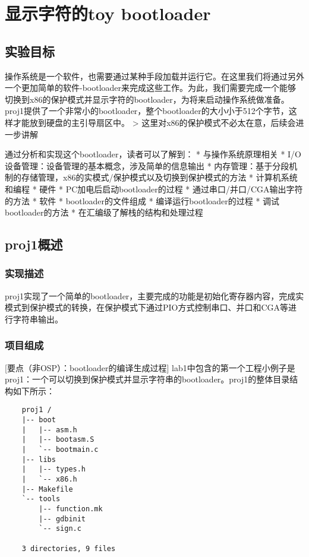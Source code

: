 \section{显示字符的toy
bootloader}\label{ux663eux793aux5b57ux7b26ux7684toy-bootloader}

\subsection{实验目标}\label{ux5b9eux9a8cux76eeux6807}

操作系统是一个软件，也需要通过某种手段加载并运行它。在这里我们将通过另外一个更加简单的软件-bootloader来完成这些工作。为此，我们需要完成一个能够切换到x86的保护模式并显示字符的bootloader，为将来启动操作系统做准备。proj1提供了一个非常小的bootloader，整个bootloader的大小小于512个字节，这样才能放到硬盘的主引导扇区中。
\textgreater{} 这里对x86的保护模式不必太在意，后续会进一步讲解

通过分析和实现这个bootloader，读者可以了解到： * 与操作系统原理相关 *
I/O设备管理：设备管理的基本概念，涉及简单的信息输出 *
内存管理：基于分段机制的存储管理，x86的实模式/保护模式以及切换到保护模式的方法
* 计算机系统和编程 * 硬件 * PC加电后启动bootloader的过程 *
通过串口/并口/CGA输出字符的方法 * 软件 * bootloader的文件组成 *
编译运行bootloader的过程 * 调试bootloader的方法 *
在汇编级了解栈的结构和处理过程

\subsection{proj1概述}\label{proj1ux6982ux8ff0}

\subsubsection{实现描述}\label{ux5b9eux73b0ux63cfux8ff0}

proj1实现了一个简单的bootloader，主要完成的功能是初始化寄存器内容，完成实模式到保护模式的转换，在保护模式下通过PIO方式控制串口、并口和CGA等进行字符串输出。

\subsubsection{项目组成}\label{ux9879ux76eeux7ec4ux6210}

{[}要点（非OSP）：bootloader的编译生成过程{]}
lab1中包含的第一个工程小例子是proj1：一个可以切换到保护模式并显示字符串的bootloader。proj1的整体目录结构如下所示：

\begin{lstlisting}
    proj1 /
    |-- boot
    |   |-- asm.h
    |   |-- bootasm.S
    |   `-- bootmain.c
    |-- libs
    |   |-- types.h
    |   `-- x86.h
    |-- Makefile
    `-- tools
        |-- function.mk
        |-- gdbinit
        `-- sign.c

    3 directories, 9 files
\end{lstlisting}

